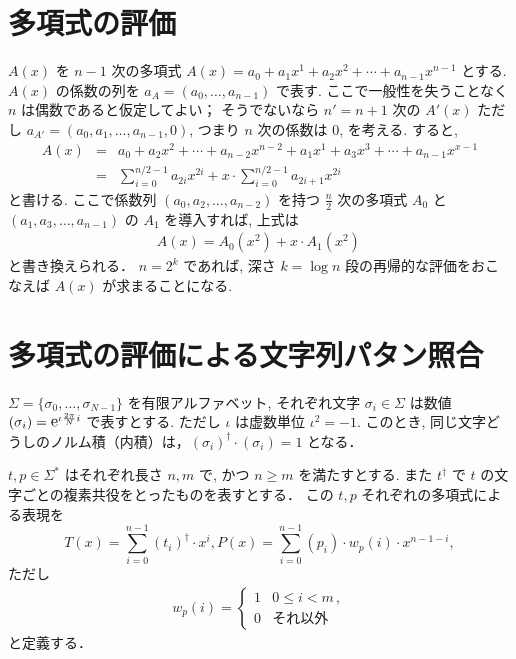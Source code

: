 \documentclass[11pt]{jarticle}
\newcommand{\napier}{%
\mathnormal{\mbox{\large{$\mathrm{e}$}}}    %
}
\begin{document}
\section{多項式の評価}

$A(x)$ を $n-1$ 次の多項式 $A(x) = a_0 + a_1 x^1 + a_2 x^2 + \cdots + a_{n-1} x^{n-1}$ とする. 
$A(x)$ の係数の列を $a_A = (a_0, \ldots, a_{n-1})$ で表す. 
ここで一般性を失うことなく $n$ は偶数であると仮定してよい； 
そうでないなら $n' = n + 1$ 次の $A'(x)$ ただし $a_{A'} = (a_0, a_1, \ldots, a_{n-1}, 0)$, つまり $n$ 次の係数は 0, を考える. 
すると, 
\begin{eqnarray*}
A(x) &=& a_0 + a_2 x^2 + \cdots + a_{n-2} x^{n-2}
+ a_1 x^1 + a_3 x^3 + \cdots +a_{n-1} x^{x-1} \\
&=& \sum_{i=0}^{n/2 - 1} a_{2i} x^{2i} + x \cdot\sum_{i=0}^{n/2 - 1} a_{2i+1} x^{2i} \,
\end{eqnarray*}
と書ける. 
ここで係数列 $(a_0, a_2, \ldots, a_{n-2})$ を持つ $\frac{n}{2}$ 次の多項式 $A_0$ と $(a_1, a_3, \ldots, a_{n-1})$ の $A_1$ を導入すれば, 上式は 
\begin{eqnarray*}
A(x) = A_0(x^2) + x \cdot A_1(x^2) \,
\end{eqnarray*}
と書き換えられる．
$n = 2^k$ であれば, 深さ $k=\log n$ 段の再帰的な評価をおこなえば $A(x)$ が求まることになる. 
 
\section{多項式の評価による文字列パタン照合}

$\Sigma = \{\sigma_0, \ldots, \sigma_{N-1}\}$ を有限アルファベット, 
それぞれ文字 $\sigma_i \in \Sigma$ は数値 $(\sigma_i) = \napier^{\iota\frac{2\pi}{N}i}$ で表すとする. 
ただし $\iota$ は虚数単位 $\iota^2 = -1$.
このとき, 同じ文字どうしのノルム積（内積）は，$(\sigma_i)^\dagger \cdot (\sigma_i) = 1$ となる．

$t, p \in \Sigma^*$ はそれぞれ長さ $n, m$ で, かつ $n \geq m$ を満たすとする. 
また $t^\dagger$ で $t$ の文字ごとの複素共役をとったものを表すとする．
この $t, p$ それぞれの多項式による表現を 
\[
T(x) = \sum_{i=0}^{n-1} (t_i)^\dagger \cdot x^i, P(x) = \sum_{i=0}^{n-1}(p_i) \cdot w_p(i) \cdot x^{n-1-i}, 
\]
ただし
\begin{eqnarray*}
w_p(i) = \left\{\begin{array}{ll}
1 & 0 \leq i < m \,,\\
0 & \mbox{それ以外}
\end{array}\right.
\end{eqnarray*}
と定義する．
\end{document}
